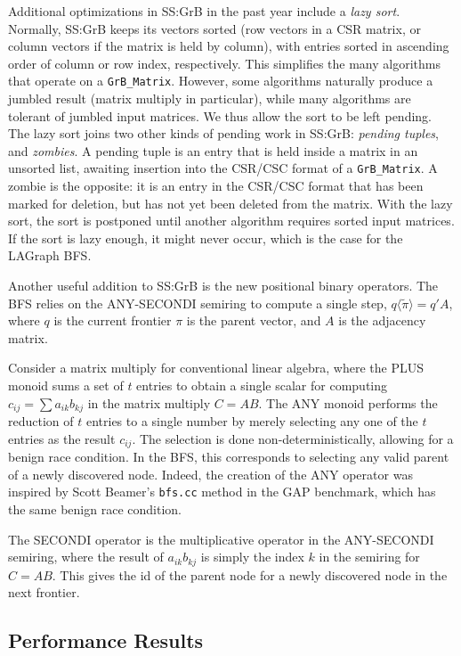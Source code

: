 Additional optimizations in SS:GrB in the past year include a {\em lazy sort}.
Normally, SS:GrB keeps its vectors sorted (row vectors in a CSR matrix, or
column vectors if the matrix is held by column), with entries sorted in
ascending order of column or row index, respectively.  This simplifies the many
algorithms that operate on a \verb'GrB_Matrix'.  However, some algorithms
naturally produce a jumbled result (matrix multiply in particular), while many
algorithms are tolerant of jumbled input matrices.  We thus allow the sort to
be left pending.  The lazy sort joins two other kinds of pending work in
SS:GrB: {\em pending tuples}, and {\em zombies}.  A pending tuple is an entry
that is held inside a matrix in an unsorted list, awaiting insertion into the
CSR/CSC format of a \verb'GrB_Matrix'.  A zombie is the opposite: it is an
entry in the CSR/CSC format that has been marked for deletion, but has not yet
been deleted from the matrix.  With the lazy sort, the sort is postponed until
another algorithm requires sorted input matrices.  If the sort is lazy enough,
it might never occur, which is the case for the LAGraph BFS.

Another useful addition to SS:GrB is the new positional binary operators.
The BFS relies on the ANY-SECONDI semiring to compute a single step,
$q \langle \tilde \pi \rangle = q'A$, where $q$ is the current frontier
$\pi$ is the parent vector, and $A$ is the adjacency matrix.

Consider a matrix multiply for conventional linear algebra, where the PLUS
monoid sums a set of $t$ entries to obtain a single scalar for computing
$c_{ij} = \sum a_{ik} b_{kj}$ in the matrix multiply $C=AB$.  The ANY monoid
performs the reduction of $t$ entries to a single number by merely selecting
any one of the $t$ entries as the result $c_{ij}$.  The selection is done
non-deterministically, allowing for a benign race condition.  In the BFS, this
corresponds to selecting any valid parent of a newly discovered node.  Indeed,
the creation of the ANY operator was inspired by Scott Beamer's \verb'bfs.cc'
method in the GAP benchmark, which has the same benign race condition.

The SECONDI operator is the multiplicative operator in the ANY-SECONDI
semiring, where the result of $a_{ik} b_{kj}$ is simply the index $k$ in the
semiring for $C=AB$.  This gives the id of the parent node for a newly
discovered node in the next frontier.

\subsection{Performance Results}

